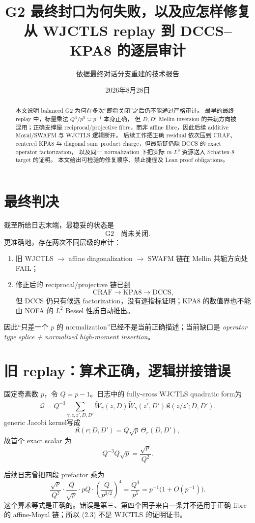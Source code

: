 \documentclass[11pt,a4paper]{ctexart}
\title{G2 最终封口为何失败，以及应怎样修复\\
\large 从 WJCTLS replay 到 DCCS--KPA8 的逐层审计}
\author{依据最终对话分支重建的技术报告}
\date{2026年8月28日}
\theoremstyle{definition}
\newcommand{\FAIL}{\textcolor{red!70!black}{\textsf{FAIL}}}
\begin{document}
\maketitle

\begin{abstract}
本文说明 balanced G2 为何在多次“即将关闭”之后仍不能通过严格审计。
最早的最终 replay 中，标量乘法 $Q^4/p^5\asymp p^{-1}$ 本身正确，
但 $D,D'$ Mellin inversion 的共轭方向被混用；正确支撑是 reciprocal/projective
fibre，而非 affine fibre，因此后续 additive Moyal/SWAFM 与 WJCTLS 逻辑断开。
后续工作把正确 residual 依次压到 CRAF、centered KPA8 与 diagonal
sum--product charge，但最新链仍缺 DCCS 的 exact operator factorization，
以及同一 normalization 下把实际 $m$-$L^8$ 资源送入 Schatten-$8$ target 的证明。
本文给出可检验的修复顺序、禁止捷径及 Lean proof obligations。
\end{abstract}

\section{最终判决}

截至所给日志末端，最稳妥的状态是
\[
\boxed{\mathrm{G2}\quad\textbf{尚未关闭}.}
\]
更准确地，存在两次不同层级的审计：
\begin{enumerate}
\item 旧 WJCTLS $\to$ affine diagonalization $\to$ SWAFM 链在 Mellin
共轭方向处 \FAIL；
\item 修正后的 reciprocal/projective 链已到
\[
\mathrm{CRAF}\to\mathrm{KPA8}\to\mathrm{DCCS},
\]
但 DCCS 仍只有候选 factorization，没有逐指标证明；KPA8 的数值界也不能由
NOFA 的 $L^2$ Bessel 性质自动推出。
\end{enumerate}
因此“只差一个 $p$ 的 normalization”已经不是当前正确描述；当前缺口是
\emph{operator type splice + normalized high-moment insertion}。

\section{旧 replay：算术正确，逻辑拼接错误}

固定奇素数 $p$，令 $Q=p-1$。日志中的 fully-cross WJCTLS quadratic form为
\[
\mathcal Q
=Q^{-3}\sum_{\gamma,z,z',D,D'}
\widetilde W_\gamma(z,D)
\overline{\widetilde W_\gamma(z',D')}
\mathfrak K(z/z';D,D').
\tag{2.1}
\]
generic Jacobi kernel写成
\[
\mathfrak K(r;D,D')=Q\sqrt p\,\Theta_r(D,D'),
\]
故首个 exact scalar 为
\[
Q^{-3}Q\sqrt p=\frac{\sqrt p}{Q^2}.
\tag{2.2}
\]

后续日志曾把四段 prefactor 乘为
\[
\frac{\sqrt p}{Q^2}\cdot\frac Q{\sqrt p}\cdot pQ
\cdot\left(\frac Q{p^{3/2}}\right)^4
=\boxed{\frac{Q^4}{p^5}}
=p^{-1}\bigl(1+O(p^{-1})\bigr).
\tag{2.3}
\]
这个算术等式是正确的。错误是第三、第四个因子来自一条并不适用于正确 fibre
的 affine-Moyal 链；所以 (2.3) 不是 WJCTLS 的证明证书。
\end{document}
